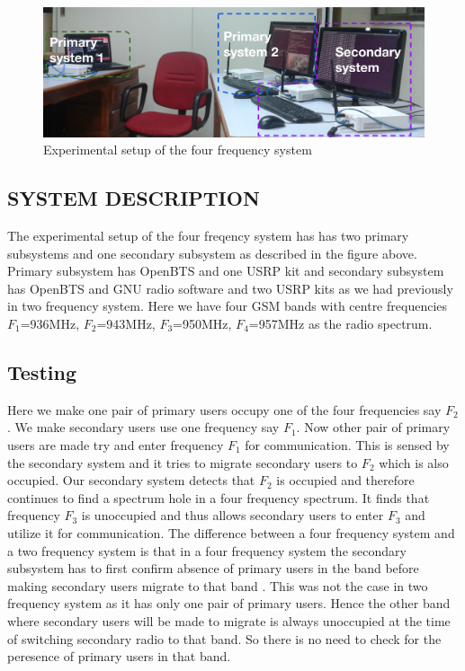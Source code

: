 \begin{figure}
\centering
\includegraphics[width=1\textwidth]{../images/freq4}
\caption[Experimental setup, 4-frequency system]{Experimental setup of the four
 frequency system}
\label{freq4}
\end{figure}

\subsection{SYSTEM DESCRIPTION}
 The experimental setup of the four freqency system has 
has two primary subsystems and one secondary subsystem as described in the figure above. Primary subsystem 
has OpenBTS and one USRP kit and secondary subsystem has OpenBTS and GNU radio 
software and two USRP kits as we had previously in two frequency system. 
Here we have four GSM bands with centre frequencies 
$F_1$=936MHz, $F_2$=943MHz, $F_3$=950MHz, $F_4$=957MHz as the radio spectrum.
 



\subsection{Testing}
Here we make one pair of primary users occupy one of the four frequencies say 
$F_2$. We make secondary users use one frequency say $F_1$. Now other pair of 
primary users are made try and enter frequency $F_1$ for communication. This is sensed by 
the secondary system and it tries to migrate secondary users to $F_2$ which is 
also occupied. Our secondary system detects that $F_2$ is occupied and therefore 
continues to find a spectrum hole in a four frequency spectrum. It finds that 
frequency $F_3$ is unoccupied and thus allows secondary users to enter $F_3$ 
and utilize it for communication. The difference between a four frequency 
system and a two frequency system is that in a four frequency 
system the secondary subsystem has to first confirm absence of primary users 
in the band before making secondary users migrate to that band . This was not
the case in two frequency system as it has only one 
pair of primary users. Hence the other band where secondary users will be made 
to migrate is always unoccupied at the time of switching secondary radio to 
that band. So there is no need to check for the peresence of primary users in that band.

